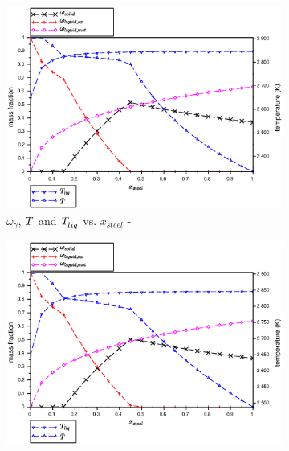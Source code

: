 \begin{figure}[H]
\begin{subfigure}[t]{0.48\textwidth}
\end{subfigure}
\\
\begin{subfigure}[t]{0.48\textwidth} 
 \centering \includegraphics[width=\textwidth]{figures/CalphadBasedEOSTest/OpenCalphad_NUCLEA9_scheilGulliver/C32_1850_x-T.eps} 
\caption{$\omega_\gamma$, $\bar{\temperature{}}$ and $\temperature{liq}$ vs. $x_{steel}$ - } \label{fig:x-T_C32_1850_OpenCalphad_NUCLEA9_scheilGulliver} 
\end{subfigure}
\hspace{0.01\textwidth}%
\begin{subfigure}[t]{0.48\textwidth} 
 \centering \includegraphics[width=\textwidth]{figures/CalphadBasedEOSTest/OpenCalphad_NUCLEA9_separatedLiquidEqs/C32_1850_x-T.eps} 

\end{subfigure}
\end{figure}

